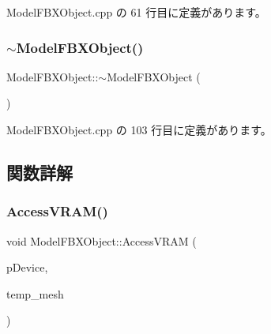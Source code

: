  Model\+F\+B\+X\+Object.\+cpp の 61 行目に定義があります。

\mbox{\label{class_model_f_b_x_object_a3fa838235e50d797539d6b266f8e2c96}} 
\subsubsection{\texorpdfstring{$\sim$\+Model\+F\+B\+X\+Object()}{~ModelFBXObject()}}
{\footnotesize\ttfamily Model\+F\+B\+X\+Object\+::$\sim$\+Model\+F\+B\+X\+Object (\begin{DoxyParamCaption}{ }\end{DoxyParamCaption})\hspace{0.3cm}{\ttfamily [virtual]}}



 Model\+F\+B\+X\+Object.\+cpp の 103 行目に定義があります。



\subsection{関数詳解}
\mbox{\label{class_model_f_b_x_object_a930e90d4107466549946b1f318857954}} 
\subsubsection{\texorpdfstring{Access\+V\+R\+A\+M()}{AccessVRAM()}}
{\footnotesize\ttfamily void Model\+F\+B\+X\+Object\+::\+Access\+V\+R\+AM (\begin{DoxyParamCaption}\item[{L\+P\+D\+I\+R\+E\+C\+T3\+D\+D\+E\+V\+I\+C\+E9}]{p\+Device,  }\item[{std\+::vector$<$ \mbox{\hyperlink{struct_model_f_b_x_object_1_1_shaderbuff}{Shaderbuff}} $>$ $\ast$}]{temp\+\_\+mesh }\end{DoxyParamCaption})\hspace{0.3cm}{\ttfamily [private]}}



